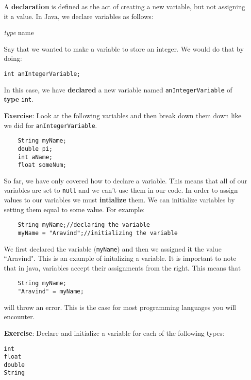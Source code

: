 \documentclass[11pt,fleqn]{article}
\begin{document}
A \textbf{declaration} is defined as the act of creating a new variable, but not
assigning it a value. In Java, we declare variables as follows:

\textit{type} name

Say that we wanted to make a variable to store an integer. We would do that by
doing:

\begin{verbatim}
int anIntegerVariable;
\end{verbatim}

In this case, we have \textbf{declared} a new variable named
\texttt{anIntegerVariable} of \textbf{type} \texttt{int}. 

\textbf{Exercise}: Look at the following variables and then break down them down
like we did for \texttt{anIntegerVariable}. 

\begin{verbatim}
    String myName;
    double pi;
    int aName;
    float someNum;
\end{verbatim}

So far, we have only covered how to declare a variable. This means that all of
our variables are set to \texttt{null} and we can't use them in our code. In
order to assign values to our variables we must \textbf{intialize} them. We can
initialize variables by setting them equal to some value. For example:

\begin{verbatim}
    String myName;//declaring the variable
    myName = "Aravind";//initializing the variable
\end{verbatim}

We first declared the variable (\texttt{myName}) and then we assigned it the
value ``Aravind". This is an example of initalizing a variable. It is important
to note that in java, variables accept their assignments from the right. This
means that 

\begin{verbatim}
    String myName;
    "Aravind" = myName;
\end{verbatim}

will throw an error. This is the case for most programming languages you will
encounter.

\textbf{Exercise}: Declare and initialize a variable for each of the following
types: 

\begin{verbatim}
int
float
double
String
\end{verbatim}
\end{document}
